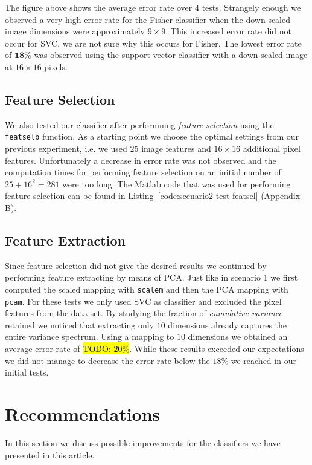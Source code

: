 \documentclass{article}
\newcommand{\todo}[1] {\hl{TODO: #1}}
\begin{document}
The figure above shows the average error rate over $4$ tests. Strangely enough we observed a very high error rate for the Fisher classifier when the down-scaled image dimensions were approximately $9 \times 9$. This increased error rate did not occur for SVC, we are not sure why this occurs for Fisher. The lowest error rate of $\mathbf{18 \%}$ was observed using the support-vector classifier with a down-scaled image at $16 \times 16$ pixels.

\subsection{Feature Selection}

We also tested our classifier after performning \emph{feature selection} using the \texttt{featselb} function. As a starting point we choose the optimal settings from our previous experiment, i.e. we used $25$ image features and $16 \times 16$ additional pixel features. Unfortunately a decrease in error rate was not observed and the computation times for performing feature selection on an initial number of $25 + 16^2 = 281$ were too long. The Matlab code that was used for performing feature selection can be found in Listing~\ref{code:scenario2-test-featsel} (Appendix B).

\subsection{Feature Extraction}

Since feature selection did not give the desired results we continued by performing feature extracting by means of PCA. Just like in scenario 1 we first computed the scaled mapping with \texttt{scalem} and then the PCA mapping with \texttt{pcam}. For these tests we only used SVC as classifier and excluded the pixel features from the data set. By studying the fraction of \emph{cumulative variance} retained we noticed that extracting only $10$ dimensions already captures the entire variance spectrum. Using a mapping to $10$ dimensions we obtained an average error rate of \todo{$20 \%$}. While these results exceeded our expectations we did not manage to decrease the error rate below the $18 \%$ we reached in our initial tests.

\section{Recommendations}

In this section we discuss possible improvements for the classifiers we have presented in this article. 
\end{document}
